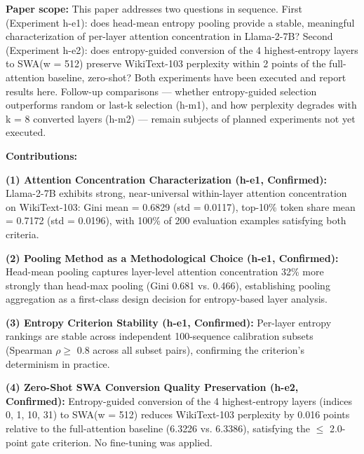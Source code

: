 \textbf{Paper scope:} This paper addresses two questions in sequence. First (Experiment h-e1): does head-mean entropy pooling provide a stable, meaningful characterization of per-layer attention concentration in Llama-2-7B? Second (Experiment h-e2): does entropy-guided conversion of the 4 highest-entropy layers to SWA(w = 512) preserve WikiText-103 perplexity within 2 points of the full-attention baseline, zero-shot? Both experiments have been executed and report results here. Follow-up comparisons --- whether entropy-guided selection outperforms random or last-k selection (h-m1), and how perplexity degrades with k = 8 converted layers (h-m2) --- remain subjects of planned experiments not yet executed.

\textbf{Contributions:}

\textbf{(1) Attention Concentration Characterization (h-e1, Confirmed):} Llama-2-7B exhibits strong, near-universal within-layer attention concentration on WikiText-103: Gini mean = 0.6829 (std = 0.0117), top-10\% token share mean = 0.7172 (std = 0.0196), with 100\% of 200 evaluation examples satisfying both criteria.

\textbf{(2) Pooling Method as a Methodological Choice (h-e1, Confirmed):} Head-mean pooling captures layer-level attention concentration 32\% more strongly than head-max pooling (Gini 0.681 vs. 0.466), establishing pooling aggregation as a first-class design decision for entropy-based layer analysis.

\textbf{(3) Entropy Criterion Stability (h-e1, Confirmed):} Per-layer entropy rankings are stable across independent 100-sequence calibration subsets (Spearman $\rho \geq$ 0.8 across all subset pairs), confirming the criterion's determinism in practice.

\textbf{(4) Zero-Shot SWA Conversion Quality Preservation (h-e2, Confirmed):} Entropy-guided conversion of the 4 highest-entropy layers (indices 0, 1, 10, 31) to SWA(w = 512) reduces WikiText-103 perplexity by 0.016 points relative to the full-attention baseline (6.3226 vs. 6.3386), satisfying the $\leq$ 2.0-point gate criterion. No fine-tuning was applied.

